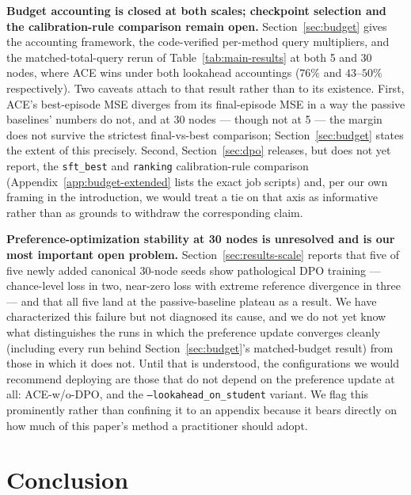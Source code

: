 \documentclass{article}
\theoremstyle{plain}
\theoremstyle{definition}
\theoremstyle{remark}
\begin{document}
\textbf{Budget accounting is closed at both scales; checkpoint selection and the calibration-rule comparison remain open.} Section~\ref{sec:budget} gives the accounting framework, the code-verified per-method query multipliers, and the matched-total-query rerun of Table~\ref{tab:main-results} at both 5 and 30 nodes, where ACE wins under both lookahead accountings ($76\%$ and $43$--$50\%$ respectively). Two caveats attach to that result rather than to its existence. First, ACE's best-episode MSE diverges from its final-episode MSE in a way the passive baselines' numbers do not, and at 30 nodes --- though not at 5 --- the margin does not survive the strictest final-vs-best comparison; Section~\ref{sec:budget} states the extent of this precisely. Second, Section~\ref{sec:dpo} releases, but does not yet report, the \texttt{sft\_best} and \texttt{ranking} calibration-rule comparison (Appendix~\ref{app:budget-extended} lists the exact job scripts) and, per our own framing in the introduction, we would treat a tie on that axis as informative rather than as grounds to withdraw the corresponding claim.

\textbf{Preference-optimization stability at 30 nodes is unresolved and is our most important open problem.} Section~\ref{sec:results-scale} reports that five of five newly added canonical 30-node seeds show pathological DPO training --- chance-level loss in two, near-zero loss with extreme reference divergence in three --- and that all five land at the passive-baseline plateau as a result. We have characterized this failure but not diagnosed its cause, and we do not yet know what distinguishes the runs in which the preference update converges cleanly (including every run behind Section~\ref{sec:budget}'s matched-budget result) from those in which it does not. Until that is understood, the configurations we would recommend deploying are those that do not depend on the preference update at all: ACE-w/o-DPO, and the \texttt{--lookahead\_on\_student} variant. We flag this prominently rather than confining it to an appendix because it bears directly on how much of this paper's method a practitioner should adopt.

\section{Conclusion}
\label{sec:conclusion}
\end{document}
